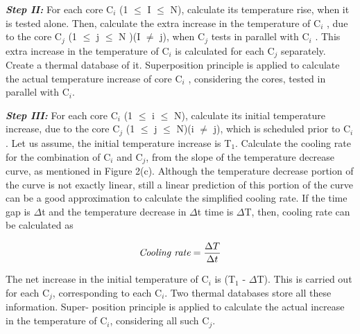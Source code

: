 \documentclass[conference]{IEEEtran}
\begin{document}
	\par
	\textbf{\textit{Step II:}} For each core C$_{i}$ (1 $\leq$ I $\leq$ N), calculate its
temperature rise, when it is tested alone. Then, calculate the
extra increase in the temperature of C$_{i}$ , due to the core C$_{j}$ (1 $\leq$
j $\leq$ N )(I $\neq$ j), when C$_{j}$ tests in parallel with C$_{i}$ . This
extra increase in the temperature of C$_{i}$ is calculated for each
C$_{j}$ separately. Create a thermal database of it. Superposition
principle is applied to calculate the actual temperature increase
of core C$_{i}$ , considering the cores, tested in parallel with C$_{i}$.\\

	\par
	\textbf{\textit{Step III:}} For each core C$_{i}$ (1 $\leq$ i $\leq$ N), calculate its initial
temperature increase, due to the core C$_{j}$ (1 $\leq$ j $\leq$ N)(i $\neq$
j), which is scheduled prior to C$_{i}$. Let us assume, the initial
temperature increase is T$_{1}$. Calculate the cooling rate for the
combination of C$_{i}$ and C$_{j}$, from the slope of the temperature
decrease curve, as mentioned in Figure 2(c). Although the
temperature decrease portion of the curve is not exactly linear,
still a linear prediction of this portion of the curve can be a
good approximation to calculate the simplified cooling rate. If
the time gap is $\Delta$t and the temperature decrease in $\Delta$t time
is $\Delta$T, then, cooling rate can be calculated as

\begin{equation}
\textit{Cooling rate} = \frac{\Delta T}{\Delta t}\\
\end{equation}
 

    \par
	The net increase in the initial temperature of C$_{i}$ is (T$_{1}$ - $\Delta$T). This is carried out for each C$_{j}$, corresponding to each
C$_{i}$. Two thermal databases store all these information. Super-
position principle is applied to calculate the actual increase in
the temperature of C$_{i}$, considering all such C$_{j}$.\\
\end{document}
